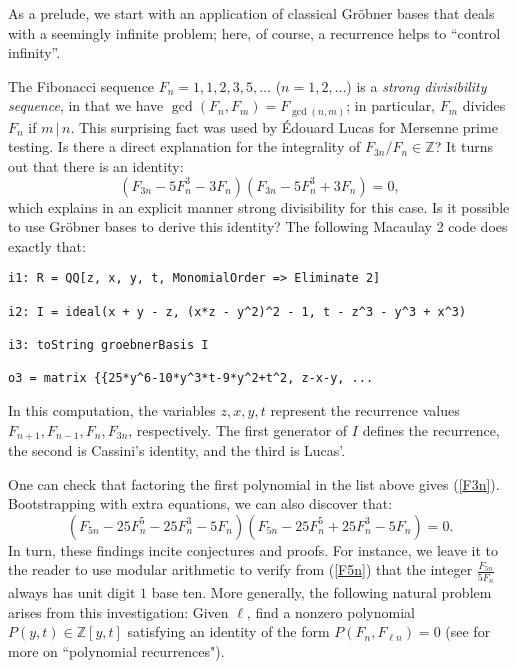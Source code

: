 As a prelude, we start with an application of classical Gr\"obner bases that deals with a seemingly infinite problem; here, of course, a recurrence helps to ``control infinity''.  

The Fibonacci sequence $F_n = 1,1,2,3,5,\ldots$ ($n= 1, 2, \ldots$) is a \textit{strong divisibility sequence}, in that we have $\gcd(F_n, F_m) = F_{\gcd(n,m)}$; in particular, $F_m$ divides $F_n$ if $m \, | \, n$.  This surprising fact was used by \'Edouard Lucas for Mersenne prime testing.  Is there a direct explanation for the integrality of $F_{3n}/F_n \in \mathbb Z$?  It turns out that there is an identity:
\begin{equation}\label{F3n}
(F_{3n} - 5 F_n^3 - 3 F_n)(F_{3n} - 5 F_n^3 + 3 F_n) = 0,
\end{equation}
which explains in an explicit manner strong divisibility for this case.   Is it possible to use Gr\"obner bases to derive this identity?  The following Macaulay 2 code does exactly that:
\begin{M2}
\begin{verbatim}
i1: R = QQ[z, x, y, t, MonomialOrder => Eliminate 2]

i2: I = ideal(x + y - z, (x*z - y^2)^2 - 1, t - z^3 - y^3 + x^3)

i3: toString groebnerBasis I

o3 = matrix {{25*y^6-10*y^3*t-9*y^2+t^2, z-x-y, ...
\end{verbatim}
\end{M2}  
In this computation, the variables $z,x,y,t$ represent the recurrence values \mbox{$F_{n+1}, F_{n-1}, F_n, F_{3n}$,} respectively.  The first generator of $I$ defines the recurrence, the second is Cassini's identity, and the third is Lucas'.

One can check that factoring the first polynomial in the list above gives (\ref{F3n}).  Bootstrapping with extra equations, we can also discover that:
\begin{equation}\label{F5n}
(F_{5n} - 25 F_n^5 - 25 F_n^3 - 5 F_n)(F_{5n} - 25 F_n^5 + 25 F_n^3 - 5 F_n) = 0.
\end{equation}
In turn, these findings incite conjectures and proofs.  
For instance, we leave it to the reader to use modular arithmetic to verify from (\ref{F5n}) that the integer $\frac{F_{5n}}{5F_n}$ always has unit digit $1$ base ten.  
More generally, the following natural problem arises from this investigation:  Given $\ell$, find a nonzero polynomial $P(y, t) \in \mathbb Z[y, t]$ satisfying an identity of the form $P(F_n, F_{\ell n}) = 0$ (see \cite{HilLev:07} for more on ``polynomial recurrences").

